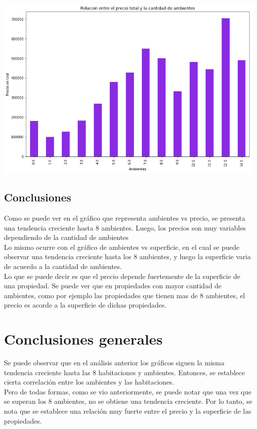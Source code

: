 \documentclass[a4paper, 10pt]{article}
\begin{document}
					\begin{center}    		
    					\includegraphics[width=\textwidth]{images/RelAmbPrec}    				
					\end{center}
					
				\subsection{Conclusiones}
					
					Como se puede ver en el gráfico que representa ambientes vs precio, se presenta una tendencia creciente hasta 8 ambientes. Luego, los precios son muy variables dependiendo de la cantidad de ambientes
					\\
					Lo mismo ocurre con el gráfico de ambientes vs superficie, en el cual se puede observar una tendencia creciente hasta los 8 ambientes, y luego la superficie varia de acuerdo a la cantidad de ambientes.
					\\
					Lo que se puede decir es que el precio depende fuertemente de la superficie de una propiedad. Se puede ver que en propiedades con mayor cantidad de ambientes, como por ejemplo las propiedades que tienen mas de 8 ambientes, el precio es acorde a la superficie de dichas propiedades.
			
			\section{ Conclusiones generales }
				
				Se puede observar que en el análisis anterior los gráficos siguen la misma tendencia creciente hasta las 8 habitaciones y ambientes. Entonces, se establece cierta correlación entre los ambientes y las habitaciones. 
				\\
				Pero de todas formas, como se vio anteriormente, se puede notar que una vez que se superan los 8 ambientes, no se obtiene una tendencia creciente. Por lo tanto, se nota que se establece una relación muy fuerte entre el precio y la superficie de las propiedades.
\end{document}
